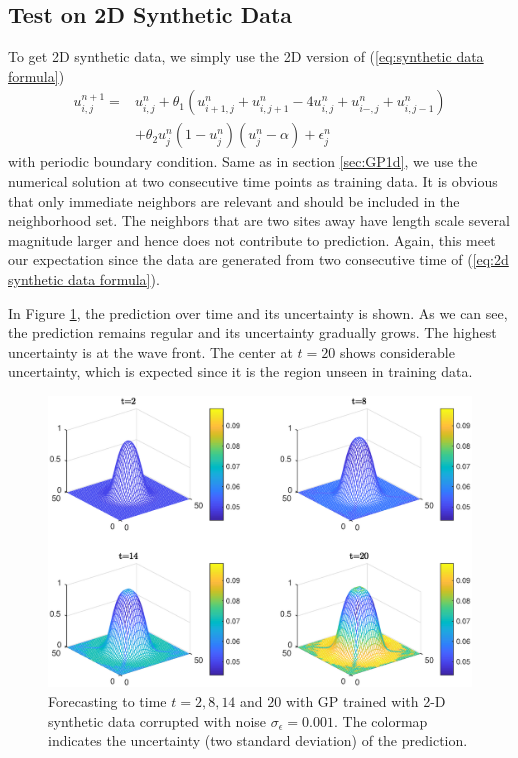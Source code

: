 \documentclass[smallextended,natbib]{svjour3}       %
\begin{document}
\subsection{Test on 2D Synthetic Data}
To get 2D synthetic data, we simply use the 2D version of (\ref{eq:synthetic data formula})
\begin{equation} \label{eq:2d synthetic data formula}
\begin{split}
u_{i,j}^{n+1}  = & u_{i,j}^{n}+\theta_{1}(u_{i+1,j}^{n}+u_{i,j+1}^{n}-4u_{i,j}^{n}+u_{i-,j}^{n}+u_{i,j-1}^{n}) \\
 &+\theta_{2}u_{j}^{n}(1-u_{j}^{n})(u_{j}^{n}-\alpha)+\epsilon_{j}^{n}
\end{split}
\end{equation}
with periodic boundary condition. Same as in section \ref{sec:GP1d}, we use the numerical solution at two consecutive time points as training data.   It is obvious that only immediate neighbors are relevant and should be included in the neighborhood set. The neighbors that are two sites away have length scale several magnitude larger and hence does not contribute to prediction. Again, this meet our expectation since the data are generated from two consecutive time of (\ref{eq:2d synthetic data formula}).     


In Figure \ref{fig:u subplot 2d}, the prediction over time and its uncertainty is shown. As we can see, the prediction remains regular and its uncertainty gradually grows. The highest uncertainty is at the wave front. The center at $t=20$ shows considerable uncertainty, which is expected since it is the region unseen in training data.    

\begin{figure}[h]
\centerline{\includegraphics[width=\textwidth]{chapterGP/figures/2d_u_surf_S_color}}
\caption[Forecasting to Time $t=2,8,14$ and $20$ with GP Trained with 2-D Synthetic Data]{\label{fig:u subplot 2d} Forecasting to time $t=2,8,14$ and $20$ with GP trained with 2-D synthetic data corrupted with noise $\sigma_{\epsilon}=0.001$. The colormap indicates the uncertainty (two standard deviation) of the prediction.}
\end{figure}
\end{document}
